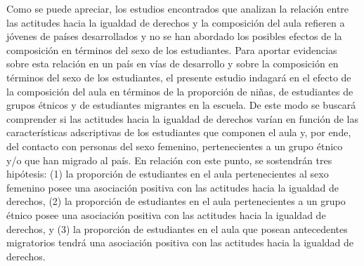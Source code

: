 \documentclass[12pt,twoside]{templates/facsothesis}
\begin{document}
Como se puede apreciar, los estudios encontrados que analizan la relación entre las actitudes hacia la igualdad de derechos y la composición del aula refieren a jóvenes de países desarrollados y no se han abordado los posibles efectos de la composición en términos del sexo de los estudiantes. Para aportar evidencias sobre esta relación en un país en vías de desarrollo y sobre la composición en términos del sexo de los estudiantes, el presente estudio indagará en el efecto de la composición del aula en términos de la proporción de niñas, de estudiantes de grupos étnicos y de estudiantes migrantes en la escuela. De este modo se buscará comprender si las actitudes hacia la igualdad de derechos varían en función de las características adscriptivas de los estudiantes que componen el aula y, por ende, del contacto con personas del sexo femenino, pertenecientes a un grupo étnico y/o que han migrado al país. En relación con este punto, se sostendrán tres hipótesis: (1) la proporción de estudiantes en el aula pertenecientes al sexo femenino posee una asociación positiva con las actitudes hacia la igualdad de derechos, (2) la proporción de estudiantes en el aula pertenecientes a un grupo étnico posee una asociación positiva con las actitudes hacia la igualdad de derechos, y (3) la proporción de estudiantes en el aula que posean antecedentes migratorios tendrá una asociación positiva con las actitudes hacia la igualdad de derechos.
\end{document}
